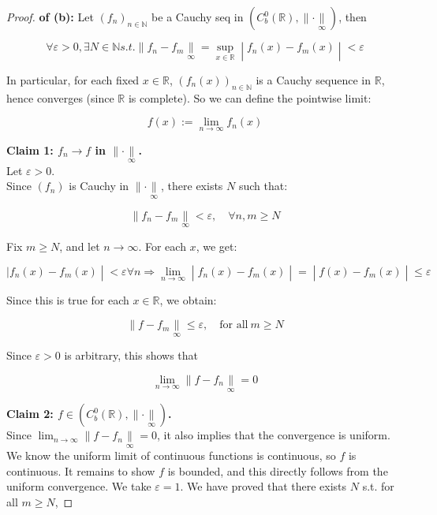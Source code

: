 \documentclass{qlnotes-export}
\begin{document}
\begin{proof}

\textbf{of (b):} Let \((f_{n})_{n \in {\mathbb{N}}}\) be a Cauchy seq in \((C_{b}^{0}({\mathbb{R}}), \parallel \cdot \underset{\infty}{\parallel})\), then

\[\left. \forall\varepsilon > 0,\exists N \in {\mathbb{N}} s.t. \parallel f_{n} - f_{m}\underset{\infty}{\parallel} = \sup\limits_{x \in {\mathbb{R}}} \middle| f_{n}(x) - f_{m}(x) \middle| < \varepsilon \right.\]

In particular, for each fixed \(x \in {\mathbb{R}}\), \((f_{n}(x))_{n \in {\mathbb{N}}}\) is a Cauchy sequence in \(\mathbb{R}\), hence converges (since \(\mathbb{R}\) is complete). So we can define the pointwise limit:

\[f(x) := \lim\limits_{n\rightarrow\infty}f_{n}(x)\]

\textbf{Claim 1: \(f_{n}\rightarrow f\) in \(\parallel \cdot \underset{\infty}{\parallel}\).}\\
Let \(\varepsilon > 0\).\\
Since \((f_{n})\) is Cauchy in \(\parallel \cdot \underset{\infty}{\parallel}\), there exists \(N\) such that:

\[\parallel f_{n} - f_{m}\underset{\infty}{\parallel} < \varepsilon,\quad\forall n,m \geq N\]

Fix \(m \geq N\), and let \(n\rightarrow\infty\). For each \(x\), we get:

\[\left. |f_{n}(x) - f_{m}(x) \middle| < \varepsilon\forall n\Longrightarrow\lim\limits_{n\rightarrow\infty} \middle| f_{n}(x) - f_{m}(x) \middle| = \middle| f(x) - f_{m}(x) \middle| \leq \varepsilon \right.\]

Since this is true for each \(x \in {\mathbb{R}}\), we obtain:

\[\parallel f - f_{m}\underset{\infty}{\parallel} \leq \varepsilon,\quad\text{for all}\ m \geq N\]

Since \(\varepsilon > 0\) is arbitrary, this shows that

\[\lim\limits_{n\rightarrow\infty} \parallel f - f_{n}\underset{\infty}{\parallel} = 0\]

\textbf{Claim 2: \(f \in (C_{b}^{0}({\mathbb{R}}), \parallel \cdot \underset{\infty}{\parallel})\).}\\
Since \(\lim_{n\rightarrow\infty} \parallel f - f_{n}\underset{\infty}{\parallel} = 0\), it also implies that the convergence is uniform.\\
We know the uniform limit of continuous functions is continuous, so \(f\) is continuous. It remains to show \(f\) is bounded, and this directly follows from the uniform convergence. We take \(\varepsilon = 1\). We have proved that there exists \(N\) s.t. for all \(m \geq N\),


\end{proof}
\end{document}
